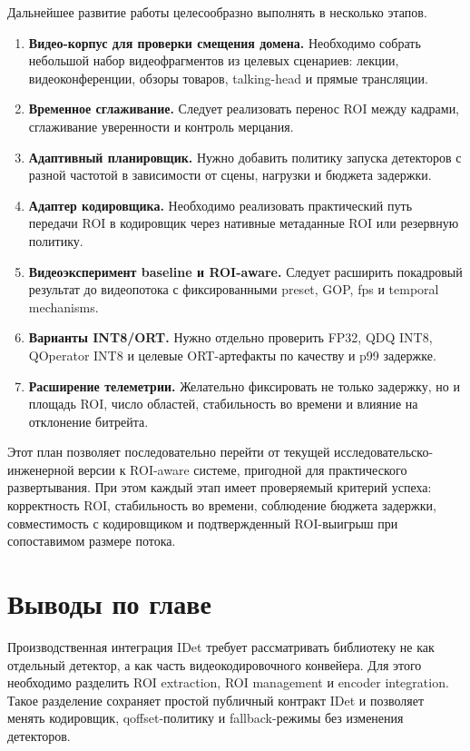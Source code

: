 \documentclass[12pt,a4paper,oneside,openany]{report}
\newcommand{\important}[1]{\textbf{#1}}
\begin{document}
Дальнейшее развитие работы целесообразно выполнять в несколько этапов.

\begin{enumerate}[label=\arabic*)]
  \item \important{Видео-корпус для проверки смещения домена.} Необходимо собрать небольшой набор
      видеофрагментов из целевых сценариев: лекции, видеоконференции, обзоры товаров,
      talking-head и прямые трансляции.
  \item \important{Временное сглаживание.} Следует реализовать перенос ROI между кадрами,
      сглаживание уверенности и контроль мерцания.
  \item \important{Адаптивный планировщик.} Нужно добавить политику запуска детекторов с разной
      частотой в зависимости от сцены, нагрузки и бюджета задержки.
  \item \important{Адаптер кодировщика.} Необходимо реализовать практический путь передачи ROI в
      кодировщик через нативные метаданные ROI или резервную политику.
  \item \important{Видеоэксперимент baseline и ROI-aware.} Следует расширить покадровый результат
      до видеопотока с фиксированными preset, GOP, fps и temporal mechanisms.
  \item \important{Варианты INT8/ORT.} Нужно отдельно проверить FP32, QDQ INT8, QOperator INT8 и
      целевые ORT-артефакты по качеству и p99 задержке.
  \item \important{Расширение телеметрии.} Желательно фиксировать не только задержку, но и площадь
      ROI, число областей, стабильность во времени и влияние на отклонение битрейта.
\end{enumerate}

Этот план позволяет последовательно перейти от текущей исследовательско-инженерной версии к
ROI-aware системе, пригодной для практического развертывания. При этом каждый этап имеет
проверяемый критерий успеха: корректность ROI, стабильность во времени, соблюдение бюджета
задержки, совместимость с кодировщиком и подтвержденный ROI-выигрыш при сопоставимом размере
потока.


\section{Выводы по главе}

Производственная интеграция IDet требует рассматривать библиотеку не как отдельный детектор, а
как часть видеокодировочного конвейера. Для этого необходимо разделить ROI extraction, ROI
management и encoder integration. Такое разделение сохраняет простой публичный контракт IDet и
позволяет менять кодировщик, qoffset-политику и fallback-режимы без изменения детекторов.
\end{document}
